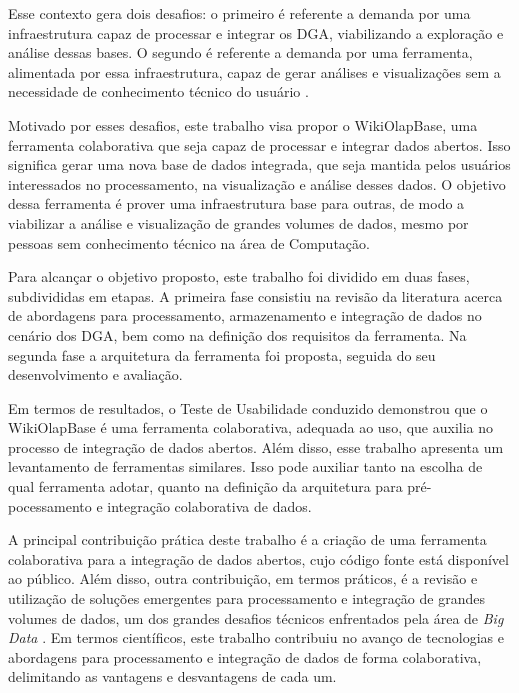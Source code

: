 Esse contexto gera dois desafios: o primeiro é referente a demanda por uma infraestrutura 
capaz de processar e integrar os DGA, viabilizando a exploração e análise dessas bases. 
O segundo é referente a demanda por uma ferramenta, alimentada por essa infraestrutura, capaz 
de gerar análises e visualizações sem a necessidade de conhecimento técnico do usuário 
\cite{graves2013}.

Motivado por esses desafios, este trabalho visa propor o WikiOlapBase, uma ferramenta 
colaborativa que seja capaz de processar e integrar dados abertos. Isso significa gerar uma 
nova base de dados integrada, que seja mantida pelos usuários interessados no processamento, 
na visualização e análise desses dados. O objetivo dessa ferramenta é prover uma infraestrutura
base para outras, de modo a viabilizar a análise e visualização de grandes 
volumes de dados, mesmo por pessoas sem conhecimento técnico na área de Computação. 

Para alcançar o objetivo proposto, este trabalho foi dividido em duas fases, subdivididas 
em etapas. A primeira fase consistiu na revisão da literatura acerca de abordagens para 
processamento, armazenamento e integração de dados no cenário dos DGA, bem como na definição 
dos requisitos da ferramenta. Na segunda fase a arquitetura da ferramenta foi proposta, 
seguida do seu desenvolvimento e avaliação.

Em termos de resultados, o Teste de Usabilidade conduzido demonstrou que o WikiOlapBase é uma
ferramenta colaborativa, adequada ao uso, que auxilia no processo de integração de dados 
abertos. Além disso, esse trabalho apresenta um levantamento de ferramentas similares. Isso
pode auxiliar tanto na escolha de qual ferramenta adotar, quanto na definição da arquitetura
para pré-pocessamento e integração colaborativa de dados.

A principal contribuição prática deste trabalho é a criação de uma ferramenta colaborativa para
a integração de dados abertos, cujo código fonte está disponível ao público. Além disso, outra
contribuição, em termos práticos, é a revisão e utilização de soluções emergentes para
processamento e integração de grandes volumes de dados, um dos grandes desafios técnicos 
enfrentados pela área de \textit{Big Data} \cite{jagadish2014}. Em termos científicos, este
trabalho contribuiu no avanço de tecnologias e abordagens para processamento e integração
de dados de forma colaborativa, delimitando as vantagens e desvantagens de cada um.

